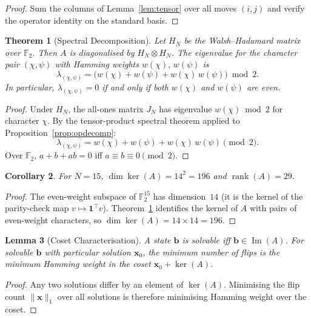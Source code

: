 \documentclass[12pt]{article}
\newtheorem{theorem}{Theorem}
\newtheorem{lemma}[theorem]{Lemma}
\newtheorem{corollary}[theorem]{Corollary}
\theoremstyle{definition}
\begin{document}
\begin{proof}
Sum the columns of Lemma~\ref{lem:tensor} over all moves $(i,j)$
and verify the operator identity on the standard basis.
\end{proof}

\begin{theorem}[Spectral Decomposition]\label{thm:eigen}
Let $H_N$ be the Walsh--Hadamard matrix over $\mathbb{F}_2$.
Then $A$ is diagonalised by $H_N\otimes H_N$.
The eigenvalue for the character pair $(\chi,\psi)$ with Hamming
weights $w(\chi),\,w(\psi)$ is
\[
  \lambda_{(\chi,\psi)}
  = \bigl(w(\chi)+w(\psi)+w(\chi)\,w(\psi)\bigr)\bmod 2.
\]
In particular, $\lambda_{(\chi,\psi)}=0$ if and only if both $w(\chi)$ and
$w(\psi)$ are even.
\end{theorem}

\begin{proof}
Under $H_N$, the all-ones matrix $J_N$ has eigenvalue
$w(\chi)\bmod 2$ for character $\chi$.
By the tensor-product spectral theorem applied to
Proposition~\ref{prop:opdecomp}:
\[
  \lambda_{(\chi,\psi)}
  = w(\chi) + w(\psi) + w(\chi)\,w(\psi) \pmod{2}.
\]
Over $\mathbb{F}_2$, $a+b+ab=0$ iff $a\equiv b\equiv 0\pmod{2}$.
\end{proof}

\begin{corollary}\label{cor:rank}
For $N=15$, $\dim\ker(A)=14^2=196$ and $\operatorname{rank}(A)=29$.
\end{corollary}

\begin{proof}
The even-weight subspace of $\mathbb{F}_2^{15}$ has dimension~$14$
(it is the kernel of the parity-check map $v\mapsto\mathbf{1}^\top v$).
Theorem~\ref{thm:eigen} identifies the kernel of $A$ with pairs of
even-weight characters, so $\dim\ker(A)=14\times 14=196$.
\end{proof}

\begin{lemma}[Coset Characterisation]\label{lem:coset}
A state $\mathbf{b}$ is solvable iff $\mathbf{b}\in\operatorname{Im}(A)$.
For solvable $\mathbf{b}$ with particular solution $\mathbf{x}_0$, the
minimum number of flips is the minimum Hamming weight in the coset
$\mathbf{x}_0+\ker(A)$.
\end{lemma}

\begin{proof}
Any two solutions differ by an element of $\ker(A)$.
Minimising the flip count $\|\mathbf{x}\|_1$ over all solutions
is therefore minimising Hamming weight over the coset.
\end{proof}
\end{document}

